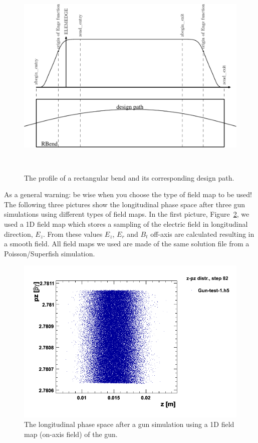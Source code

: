 \begin{figure}[ht]
  \begin{center}
    \includegraphics[origin=bl,height=100mm,angle=0]{./figures/Fieldmaps/profile-1.pdf}
    \caption{The profile of a rectangular bend and its corresponding design path.}
    \label{fig:fringefields}
  \end{center}
\end{figure}

\leftpointright As a general warning: be wise when you choose the type of field map to be used! The following three pictures show the longitudinal phase space after three gun simulations using different types of field maps. In the first picture, Figure~\ref{figure_1ddynamic_step82}, we used a 1D field map which stores a sampling of the electric field in longitudinal direction, $E_z$. From these values $E_z$, $E_r$ and $B_t$ off-axis are calculated resulting in a smooth field. All field maps we used are made of the same solution file from a Poisson/Superfish simulation.
\begin{figure}
  \begin{center}
  \includegraphics[origin=bl,height=80mm,angle=0]{./figures/Fieldmaps/1DDynamic_step82.png}
  \caption{\label{figure_1ddynamic_step82}
    The longitudinal phase space after a gun simulation using a 1D field map (on-axis field) of the gun.
  }
  \end{center}
%
\end{figure}

